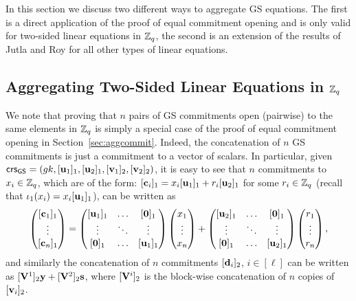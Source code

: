 In this section we discuss two different ways to aggregate GS equations. The first is a direct application of the proof of equal commitment opening and is only valid for two-sided linear equations in $\mathbb{Z}_q$, the second is an extension of the results of Jutla and Roy for all other types of linear equations.

\subsection{Aggregating Two-Sided Linear Equations in $\mathbb{Z}_q$}
\label{sec:ts-zq}
We note that proving that $n$ pairs of GS commitments open (pairwise) to the same elements in $\mathbb{Z}_q$ is simply a special case of 
the proof of equal commitment opening in Section~\ref{sec:aggcommit}. Indeed, the concatenation of $n$ GS commitments is just a commitment to a vector of scalars. In particular,  given $\mathsf{crs}_{\mathsf{GS}}=({gk},[\mathbf{u}_1]_1,[\mathbf{u}_2]_1,[\mathbf{v}_1]_2,[\mathbf{v}_2]_2)$,  it is easy to see that  $n$ commitments to $x_i \in \mathbb{Z}_q$, which are of the form:
 $[\mathbf{c}_i]_1= x_i [\mathbf{u}_1]_1 +r_i [\mathbf{u}_2]_1$ for some $r_i \in \mathbb{Z}_q$ (recall that $\iota_1(x_i)= x_i [\mathbf{u}_1]_1$), can be written as  
 $$\begin{pmatrix} [\vecb{c}_1]_1 \\ \vdots \\ [\vecb{c}_n]_1 \end{pmatrix}=   \begin{pmatrix} [\vecb{u}_1]_1 & \ldots & [\vecb{0}]_1\\ \vdots & \ddots & \vdots \\   [\vecb{0}]_1 & \ldots & [\vecb{u}_1]_1  \end{pmatrix} \begin{pmatrix} x_1 \\ \vdots \\ x_n \end{pmatrix}
 + \begin{pmatrix} [\vecb{u}_2]_1 & \ldots & [\vecb{0}]_1\\ \vdots & \ddots & \vdots \\  [\vecb{0}]_1 & \ldots & [\vecb{u}_2]_1  \end{pmatrix}
 \begin{pmatrix} r_1 \\ \vdots \\ r_n \end{pmatrix},
 $$
and similarly the concatenation of $n$ commitments $[\mathbf{d}_i]_2$, $i \in [\ell]$ can be written as $[\mathbf{{V}}^1]_2\mathbf{y}+[\mathbf{{V}}^2]_2 \mathbf{s}$, where $[\mathbf{{V}}^i]_2$ is the block-wise concatenation of $n$ copies of $[\mathbf{v}_i]_2$.  

